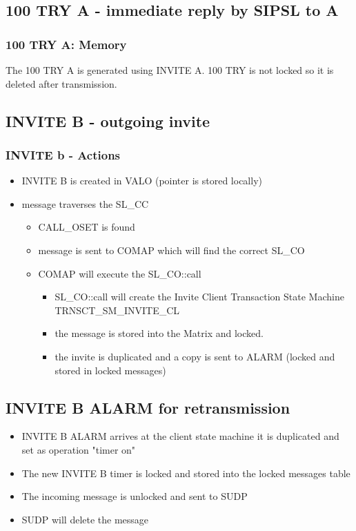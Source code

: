 \documentclass[a4paper]{report}
\begin{document}
\subsection{100 TRY A - immediate reply by SIPSL to A}

\subsubsection{100 TRY A: Memory}
The 100 TRY A is generated using INVITE A. 100 TRY is not locked so it is deleted after transmission.

\subsection{INVITE B - outgoing invite}
\subsubsection{INVITE b - Actions}

\begin {itemize}
\item INVITE B is created in VALO (pointer is stored locally)
\item message traverses the SL\_CC
\begin {itemize}
\item CALL\_OSET is found
\item message is sent to COMAP which will find the correct SL\_CO
\item COMAP will execute the SL\_CO::call
\begin {itemize}
\item SL\_CO::call will create the Invite Client Transaction State Machine TRNSCT\_SM\_INVITE\_CL
\item the message is stored into the Matrix and locked.
\item the invite is duplicated and a copy is sent to ALARM (locked and stored in locked messages)
\end{itemize}
\end{itemize}
\end{itemize}

\subsection{INVITE B ALARM for retransmission}

\begin {itemize}
\item INVITE B ALARM arrives at the client state machine it is duplicated and set as operation "timer on"
\item The new INVITE B timer is locked and stored into the locked messages table
\item The incoming message is unlocked and sent to SUDP
\item SUDP will delete the message
\end{itemize}
\end{document}
